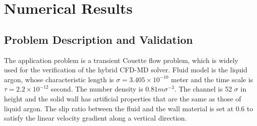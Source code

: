 \documentclass[]{aiaa-tc}%
\begin{document}
\section{Numerical Results}
\label{sec:result}

\subsection{Problem Description and Validation}
\label{sec:result_val}

The application problem is a transient Couette flow problem, which is widely used
for the verification of the hybrid CFD-MD solver. Fluid model is the liquid argon, whose
characteristic length is ${\sigma}=3.405{\times}10^{-10}$ meter and the time scale is 
$\tau=2.2{\times}10^{-12}$ second. The number density is $0.81m{\sigma}^{-3}$.
The channel is 52 $\sigma$ in height and the solid wall has artificial properties 
that are the same as those of liquid argon. The slip ratio between the fluid and the wall
material is set at 0.6 to satisfy the linear velocity gradient along a vertical 
direction.~\cite{Nie}
\end{document}
